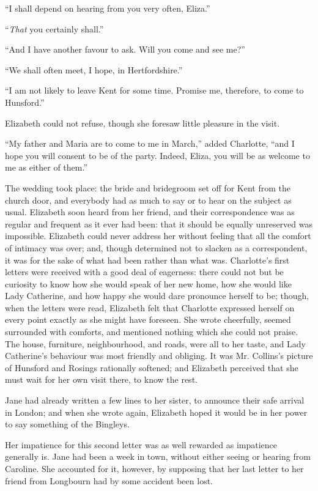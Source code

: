 \documentclass[12pt,openright]{book}
\begin{document}
“I shall depend on hearing from you very often, Eliza.”

“\textit{That} you certainly shall.”

“And I have another favour to ask. Will you come and see me?”

“We shall often meet, I hope, in Hertfordshire.”

“I am not likely to leave Kent for some time. Promise me, therefore, to come to Hunsford.”

Elizabeth could not refuse, though she foresaw little pleasure in the visit.

“My father and Maria are to come to me in March,” added Charlotte, “and I hope you will consent to be of the party. Indeed, Eliza, you will be as welcome to me as either of them.”

The wedding took place: the bride and bridegroom set off for Kent from the church door, and everybody had as much to say or to hear on the subject as usual. Elizabeth soon heard from her friend, and their correspondence was as regular and frequent as it ever had been: that it should be equally unreserved was impossible. Elizabeth could never address her without feeling that all the comfort of intimacy was over; and, though determined not to slacken as a correspondent, it was for the sake of what had been rather than what was. Charlotte’s first letters were received with a good deal of eagerness: there could not but be curiosity to know how she would speak of her new home, how she would like Lady Catherine, and how happy she would dare pronounce herself to be; though, when the letters were read, Elizabeth felt that Charlotte expressed herself on every point exactly as she might have foreseen. She wrote cheerfully, seemed surrounded with comforts, and mentioned nothing which she could not praise. The house, furniture, neighbourhood, and roads, were all to her taste, and Lady Catherine’s behaviour was most friendly and obliging. It was Mr. Collins’s picture of Hunsford and Rosings rationally softened; and Elizabeth perceived that she must wait for her own visit there, to know the rest.

Jane had already written a few lines to her sister, to announce their safe arrival in London; and when she wrote again, Elizabeth hoped it would be in her power to say something of the Bingleys.

Her impatience for this second letter was as well rewarded as impatience generally is. Jane had been a week in town, without either seeing or hearing from Caroline. She accounted for it, however, by supposing that her last letter to her friend from Longbourn had by some accident been lost.
\end{document}
